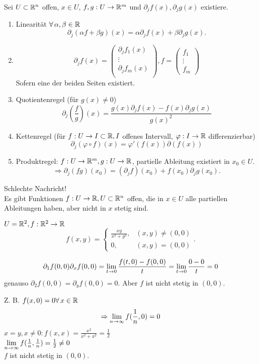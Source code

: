 \documentclass[../ana2.tex]{subfiles}
\begin{document}
\begin{lem}
    Sei \( U \subset \mathbb{R}^n \) offen, \( x\in U \), 
    \( f,g:U\rightarrow \mathbb{R}^m \) und 
    \( \partial_j f(x), \partial_j g(x) \) existiere.
    \begin{enumerate}
        \item Linearität \( \forall \alpha, \beta \in \R \)
        \[ \partial_j (\alpha f + \beta g)(x) 
        = \alpha \partial_j f(x) + \beta \partial_j g(x). \]
        \item \[ \partial_j f(x) = \left(\begin{array}{c}
            \partial_j f_1(x) \\
            \vdots \\
            \partial_j f_m(x) \\
        \end{array}\right), 
        f = \left( \begin{array}{c}
            f_1\\
            \vdots \\
            f_m           
        \end{array} \right) \]
        Sofern eine der beiden Seiten existiert.
        \item Quotientenregel (für \( g(x) \neq 0 \))
        \[ \partial_j \left(\frac{f}{g}\right)(x) 
        = \frac{g(x) \partial_j f(x) - f(x) \partial_j g(x)}{g(x)^2} \]
        \item Kettenregel (für \( f:U\rightarrow I \subset \mathbb{R}, 
        I \) offenes Intervall, 
        \( \varphi:I\rightarrow \mathbb{R} \) differenzierbar)
        \[ \partial_j (\varphi \circ f)(x) 
        = \varphi'(f(x)) \partial(f(x)) \]
        \item Produktregel: \( f:U\rightarrow \mathbb{R}^m, 
        g:U\rightarrow \mathbb{R} \), partielle Ableitung 
        existiert in \( x_0 \in U \).
        \[ \Rightarrow \partial_j(fg)(x_0) 
        = (\partial_j f)(x_0) + f(x_0) \partial_j g(x_0). \]
    \end{enumerate}
\end{lem}
Schlechte Nachricht!\\
Es gibt Funktionen \( f:U\rightarrow \mathbb{R}, U \subset \mathbb{R}^n \) offen, 
die in \( x\in U \) alle partiellen Ableitungen haben, 
aber nicht in \( x \) stetig sind.
\begin{bsp}
    \( U = \mathbb{R}^2, f:\mathbb{R}^2\rightarrow \mathbb{R} \)
    \[ f(x,y) = \begin{cases}
        \frac{xy}{x^2 + y^2}, &(x,y) \neq (0,0)\\
        0, &(x,y) = (0,0)
    \end{cases}. \]

    \[ \partial_1 f(0,0) \partial_x f(0,0) 
    = \lim\limits_{t\rightarrow{}0} \frac{f(t,0) - f(0,0)}{t} 
    = \lim\limits_{t\rightarrow{}0} \frac{0 - 0}{t} = 0 \]
    genauso \( \partial_2 f(0,0) = \partial_y f(0,0) = 0 \).
    Aber \(f\) ist nicht stetig in \( (0,0) \).

    Z. B. \( f(x,0) = 0 \forall x \in \R \)
    \[ \Rightarrow \lim\limits_{n\rightarrow\infty} f(\frac{1}{n},0) = 0 \]
    \( x=y, x \neq 0: f(x,x) = \frac{x^2}{x^2 + x^2} = \frac{1}{2} \) \\
    \( \lim\limits_{n\rightarrow\infty} f(\frac{1}{n}, \frac{1}{n}) = \frac{1}{2} \neq 0 \) \\
    \( f \) ist nicht stetig in \( (0,0) \).
\end{bsp}
\end{document}
